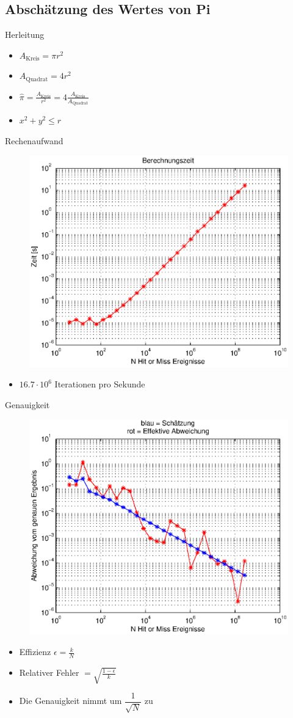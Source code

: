 \documentclass{beamer}
\begin{document}
\subsection{Abschätzung des Wertes von Pi}
\begin{frame}{Herleitung}
	\begin{itemize}
	\item<1-> $A_{\text{Kreis}} = \pi r^{2}$
	\item<1-> $A_{\text{Quadrat}} = 4r^2$
	\item<1-> $\hat{\pi} = \frac{A_{\text{Kreis}}}{r^2} = 4 \frac{A_{\text{Kreis}}}{A_{\text{Quadrat}}}$
	\item<1-> $x^2 + y^2 \leq r$
	\end{itemize}
\end{frame}

\begin{frame}{Rechenaufwand}
\begin{figure}[h]
		\centering
		\includegraphics[width=0.7\linewidth]{images/Berechnungszeit.eps}
	\end{figure}
	\begin{itemize}
	\item<1-> $16.7 \cdot 10^6$ Iterationen pro Sekunde
	\end{itemize}
\end{frame}
\begin{frame}{Genauigkeit}
\begin{figure}[h]
		\centering
		\includegraphics[width=0.5\linewidth]{images/Fehler.eps}
	\end{figure}
	\begin{itemize}
		\item<1-> Effizienz $\epsilon = \frac{k}{N}$
		\item<1->Relativer Fehler $= \sqrt{\frac{1-\epsilon}{k}}$
		\item<1-> Die Genauigkeit nimmt um $\dfrac{1}{\sqrt{N}}$ zu
	\end{itemize}
\end{frame}
\end{document}
